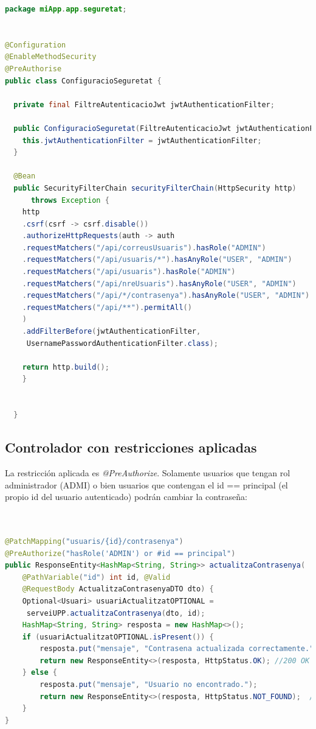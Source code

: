 \documentclass[a4paper,12pt]{report}
\begin{document}
				
		\begin{lstlisting}[language=java, basicstyle=\ttfamily\footnotesize, keywordstyle=\color{magenta}]
package miApp.app.seguretat;


@Configuration
@EnableMethodSecurity 
@PreAuthorise
public class ConfiguracioSeguretat {
	
  private final FiltreAutenticacioJwt jwtAuthenticationFilter;

  public ConfiguracioSeguretat(FiltreAutenticacioJwt jwtAuthenticationFilter) {
    this.jwtAuthenticationFilter = jwtAuthenticationFilter;
  }

  @Bean
  public SecurityFilterChain securityFilterChain(HttpSecurity http) 
      throws Exception {
	http
	.csrf(csrf -> csrf.disable())
	.authorizeHttpRequests(auth -> auth
	.requestMatchers("/api/correusUsuaris").hasRole("ADMIN")
	.requestMatchers("/api/usuaris/*").hasAnyRole("USER", "ADMIN")
	.requestMatchers("/api/usuaris").hasRole("ADMIN")                       
	.requestMatchers("/api/nreUsuaris").hasAnyRole("USER", "ADMIN")        
	.requestMatchers("/api/*/contrasenya").hasAnyRole("USER", "ADMIN")
	.requestMatchers("/api/**").permitAll()
	)
	.addFilterBefore(jwtAuthenticationFilter,
	 UsernamePasswordAuthenticationFilter.class);
	
	return http.build();
    }
	
	
  }
		\end{lstlisting}
	
	
	
		\subsection{Controlador con restricciones aplicadas}
		\label{sec:detallSeguretatControlador}
		
		La restricción aplicada es \textit{@PreAuthorize}. Solamente usuarios que tengan rol administrador (ADMI) o bien usuarios que contengan el id == principal (el propio id del usuario autenticado) podrán cambiar la contraseña:
		
\begin{lstlisting}[language=java,  basicstyle=\ttfamily\footnotesize, keywordstyle=\color{magenta}]


@PatchMapping("usuaris/{id}/contrasenya")
@PreAuthorize("hasRole('ADMIN') or #id == principal") 
public ResponseEntity<HashMap<String, String>> actualitzaContrasenya(
	@PathVariable("id") int id, @Valid 
	@RequestBody ActualitzaContrasenyaDTO dto) {
	Optional<Usuari> usuariActualitzatOPTIONAL =
	 serveiUPP.actualitzaContrasenya(dto, id);
	HashMap<String, String> resposta = new HashMap<>(); 
	if (usuariActualitzatOPTIONAL.isPresent()) {
		resposta.put("mensaje", "Contrasena actualizada correctamente.");
		return new ResponseEntity<>(resposta, HttpStatus.OK); //200 OK
	} else {
		resposta.put("mensaje", "Usuario no encontrado.");
		return new ResponseEntity<>(resposta, HttpStatus.NOT_FOUND);  //404 NOT FOUND
	}
}

\end{lstlisting}
			
\end{document}
